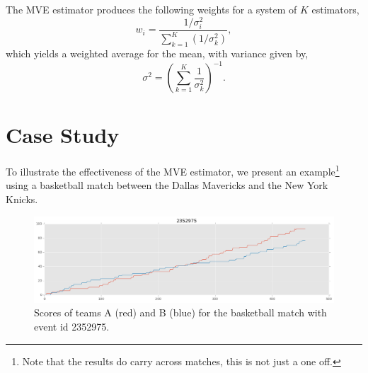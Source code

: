 The MVE estimator produces the following weights for a system of $K$
estimators,
\begin{equation}
    w_i = \frac{1/\sigma_i^2}{\sum_{k=1}^K(1/\sigma_k^2)},
\end{equation}
which yields a weighted average for the mean, with variance given by,
\begin{equation}
    \sigma^2 = \left(\sum_{k=1}^K \frac{1}{\sigma_k^2} \right)^{-1}.
\end{equation}


\section{Case Study}
To illustrate the effectiveness of the MVE estimator, we present an
example\footnote{Note that the results do carry across matches, this is not
just a one off.} using a basketball match between the Dallas Mavericks and the
New York Knicks.

\begin{figure}[H]
    \centering
    \includegraphics[width=\figwidth]{img/estimation/scores.png}

    \caption{Scores of teams A (red) and B (blue) for the basketball match with
    event id 2352975.}\label{fig:estimation:scores}
\end{figure}

